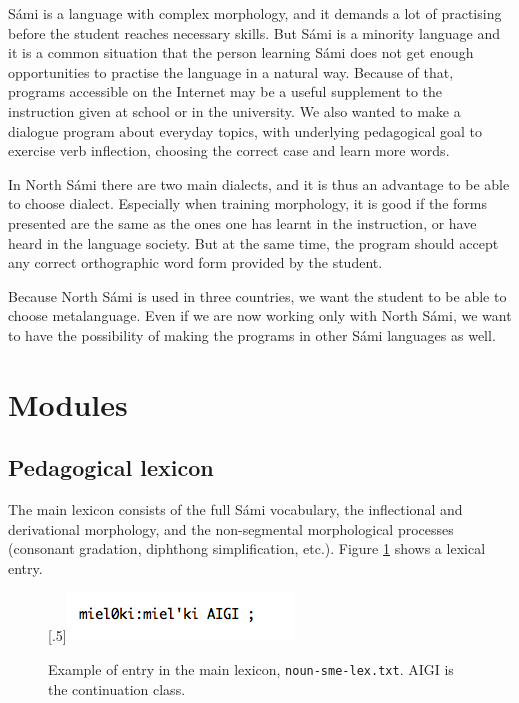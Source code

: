 \documentclass[a4paper,12pt]{article}
\begin{document}
Sámi is a language with complex morphology, and it demands a lot of practising before the student reaches necessary skills. But Sámi is a minority language and it is a common situation that the person learning Sámi does not get enough opportunities to practise the language in a natural way. Because of that, programs accessible on the Internet may be a useful supplement to the instruction given at school or in the university. We also wanted to make a dialogue program about everyday topics, with underlying pedagogical goal to exercise verb inflection, choosing the correct case and learn more words. 

In North Sámi there are two main dialects, and it is thus an advantage to be able to choose dialect. Especially when training morphology, it is good if the forms presented are the same as the ones one has learnt in the instruction, or have heard in the language society. But at the same time, the program should accept any correct orthographic word form provided by the student.

Because North Sámi is used in three countries, we want the student to be able to choose metalanguage. Even if we are now working only with North Sámi, we want to have the possibility of making the programs in other Sámi languages as well.



\section{Modules}

\subsection{Pedagogical lexicon}

The main lexicon consists of the full Sámi vocabulary, the inflectional and derivational morphology, and the non-segmental morphological processes (consonant gradation, diphthong simplification, etc.). Figure \ref{nounsmelex} shows a lexical entry.


\begin{figure}[htbp]
\begin{center}
\scalebox{.5}[.5]{\includegraphics{presentation/img/noun-sme-lex.png}}\\
\caption{Example of entry in the main lexicon, \texttt{noun-sme-lex.txt}. AIGI is the continuation class.}
\label{nounsmelex}
\end{center}
\end{figure}
\end{document}
